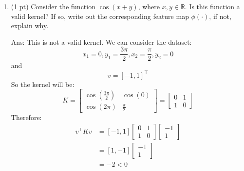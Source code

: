 \documentclass[10pt,letter,notitlepage]{article}
\newcommand{\ans}[1]{{\color{orange}\textsf{Ans}: #1}}
\newcounter{exercise}
\begin{document}
\begin{exercise}
\begin{enumerate}
\ans{
  \color{orange}
  This is not a valid kernel. We can consider the dataset:
  $$
    x_1 = 1, y_1 = 2, x_2 = 2, y_2 = 1
  $$
  and
  $$
  v = [-1, 1]^\top
  $$
  So the kernel will be:
  $$
  K = \begin{bmatrix}
        \log(3) & \log(2) \\
        \log(5) & \log(3)
        \end{bmatrix}
  $$
  Therefore:
  \begin{align*}
    v^\top K v &= [-1, 1] \begin{bmatrix}
        \log(3) & \log(2) \\
        \log(5) & \log(3)
        \end{bmatrix} \begin{bmatrix}
        -1 \\
        1 
        \end{bmatrix} \\
        &= [-\log 3 + \log 5, -\log2 + \log3] \begin{bmatrix}
        -1 \\
        1 
        \end{bmatrix} \\
        &= \log3 - \log5 - \log2 + \log 3 \\
        & = \log(\frac{9}{10}) < 0
  \end{align*}
}
    \item (1 pt) Consider the function $\cos(x + y)$, where $x, y \in \mathbb{R}$.
      Is this function a valid kernel?
      If so, write out the corresponding feature map $\phi(\cdot)$, if not, explain why.

\ans{
  This is not a valid kernel. We can consider the dataset:
  $$
    x_1 = 0, y_1 = \frac{3\pi}{2}, x_2 = \frac{\pi}{2}, y_2 = 0
  $$
  and
  $$
  v = [-1, 1]^\top
  $$
  So the kernel will be:
  $$
  K = \begin{bmatrix}
        \cos(\frac{3\pi}{2}) & \cos(0) \\
        \cos(2\pi) & \frac{\pi}{2}
        \end{bmatrix}
    = \begin{bmatrix}
        0 & 1 \\
        1 & 0
        \end{bmatrix}
  $$
  Therefore:
  \begin{align*}
    v^\top K v &= [-1, 1] \begin{bmatrix}
        0 & 1 \\
        1 & 0
        \end{bmatrix}\begin{bmatrix}
        -1 \\
        1 
        \end{bmatrix} \\
        &= [1, -1] \begin{bmatrix}
        -1 \\
        1 
        \end{bmatrix} \\
        &= -2 < 0
  \end{align*}
}
  \end{enumerate}
\end{exercise}
\end{document}
